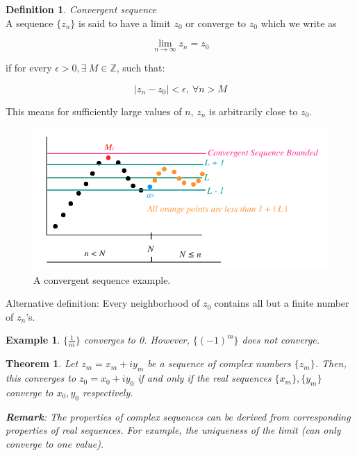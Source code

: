 \documentclass{article}
\newtheorem{theorem}{Theorem}[section]
\newtheorem{ex}{Example}
\theoremstyle{definition}
\newtheorem{definition}{Definition}[section]
\newcommand{\Def}[2]{
\begin{shaded*}
\begin{definition}{\textit{#1}}\\#2\end{definition}
\end{shaded*}
}
\begin{document}
\Def{Convergent sequence}{A sequence $\{z_n\}$ is said to have a limit $z_0$ or converge to $z_0$ which we write as 

$$\lim_{n\to\infty} z_n = z_0$$

if for every $\epsilon > 0, \exists\ M \in  \mathbb{Z}$, such that:

$$|z_n - z_0| < \epsilon,\ \forall n > M$$

This means for sufficiently large values of $n$, $z_n$ is arbitrarily close to $z_0$.

\begin{figure}[H]
	\centering
	\includegraphics[width=0.7\linewidth]{convseq}
	\caption{A convergent sequence example. }
	\label{fig:convseq}
\end{figure}

Alternative definition: Every neighborhood of $z_0$ contains all but a finite number of $z_n$'s.
}

\begin{ex}
$\{\frac{1}{m}\}$ converges to 0. However, $\{(-1)^{m}\}$ does not converge. 
\end{ex}

\begin{theorem}
Let $z_m = x_m + i y_m$ be a sequence of complex numbers $\{z_m\}$. Then, this converges to $z_0 = x_0 + i y_0$ if and only if the real sequences $\{x_m\}, \{y_m\}$ converge to $x_0, y_0$ respectively.

\textbf{Remark}: The properties of complex sequences can be derived from corresponding properties of real sequences. For example, the uniqueness of the limit (can only converge to one value).
\end{theorem}
\end{document}
